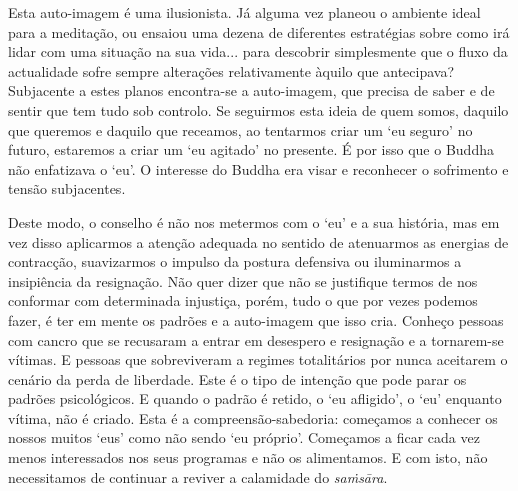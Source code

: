 Esta auto-imagem é uma ilusionista. Já alguma vez planeou o ambiente ideal para a meditação, ou ensaiou uma dezena de diferentes estratégias sobre como irá lidar com uma situação na sua vida... para descobrir simplesmente que o fluxo da actualidade sofre sempre alterações relativamente àquilo que antecipava? Subjacente a estes planos encontra-se a auto-imagem, que precisa de saber e de sentir que tem tudo sob controlo. Se seguirmos esta ideia de quem somos, daquilo que queremos e daquilo que receamos, ao tentarmos criar um `eu seguro' no futuro, estaremos a criar um `eu agitado' no presente. É por isso que o Buddha não enfatizava o `eu'. O interesse do Buddha era visar e reconhecer o sofrimento e tensão subjacentes.

Deste modo, o conselho é não nos metermos com o `eu' e a sua história, mas em vez disso aplicarmos a atenção adequada no sentido de atenuarmos as energias de contracção, suavizarmos o impulso da postura defensiva ou iluminarmos a insipiência da resignação. Não quer dizer que não se justifique termos de nos conformar com determinada injustiça, porém, tudo o que por vezes podemos fazer, é ter em mente os padrões e a auto-imagem que isso cria. Conheço pessoas com cancro que se recusaram a entrar em desespero e resignação e a tornarem-se vítimas. E pessoas que sobreviveram a regimes totalitários por nunca aceitarem o cenário da perda de liberdade. Este é o tipo de intenção que pode parar os padrões psicológicos. E quando o padrão é retido, o `eu afligido', o `eu' enquanto vítima, não é criado. Esta é a compreensão-sabedoria: começamos a conhecer os nossos muitos `eus' como não sendo `eu próprio'. Começamos a ficar cada vez menos interessados nos seus programas e não os alimentamos. E com isto, não necessitamos de continuar a reviver a calamidade do \emph{saṁsāra}.

